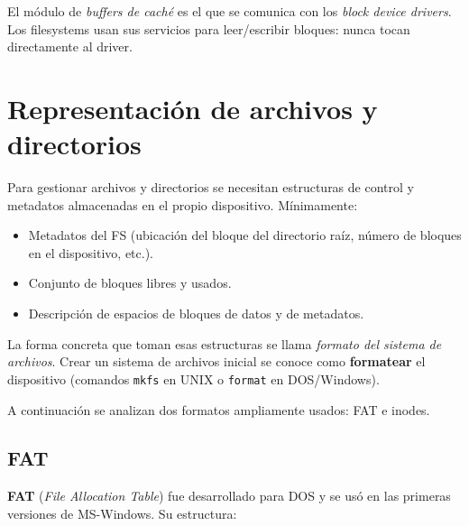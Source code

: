 \documentclass[11pt,a4paper]{article}
\begin{document}
\begin{importante}
El módulo de \emph{buffers de caché} es el que se comunica con los
\emph{block device drivers}. Los filesystems usan sus servicios para
leer/escribir bloques: nunca tocan directamente al driver.
\end{importante}

\section{Representación de archivos y directorios}

Para gestionar archivos y directorios se necesitan estructuras de
control y metadatos almacenadas en el propio dispositivo. Mínimamente:

\begin{itemize}[leftmargin=*,nosep]
    \item Metadatos del FS (ubicación del bloque del directorio raíz,
        número de bloques en el dispositivo, etc.).
    \item Conjunto de bloques libres y usados.
    \item Descripción de espacios de bloques de datos y de metadatos.
\end{itemize}

La forma concreta que toman esas estructuras se llama \emph{formato del
sistema de archivos}. Crear un sistema de archivos inicial se conoce
como \textbf{formatear} el dispositivo (comandos \texttt{mkfs} en UNIX
o \texttt{format} en DOS/Windows).

A continuación se analizan dos formatos ampliamente usados: FAT e
inodes.

\subsection{FAT}

\textbf{FAT} (\emph{File Allocation Table}) fue desarrollado para DOS y
se usó en las primeras versiones de MS-Windows. Su estructura:

\begin{center}
\end{center}
\end{document}
